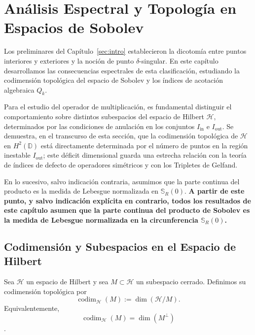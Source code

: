 \chapter{Análisis Espectral y Topología en Espacios de Sobolev}\label{sec:espectral}

Los preliminares del Capítulo~\ref{sec:intro} establecieron la dicotomía entre puntos interiores y exteriores y la noción de punto $\delta$-singular. En este capítulo desarrollamos las consecuencias espectrales de esta clasificación, estudiando la codimensión topológica del espacio de Sobolev y los índices de acotación algebraica $Q_k$.

Para el estudio del operador de multiplicación, es fundamental distinguir el comportamiento sobre distintos subespacios del espacio de Hilbert $\mathcal{H}$, determinados por las condiciones de anulación en los conjuntos $I_{\mathrm{in}}$ e $I_{\mathrm{out}}$. Se demuestra, en el transcurso de esta sección, que la codimensión topológica de $\mathcal{H}$ en $H^2(\mathbb{D})$ está directamente determinada por el número de puntos en la región inestable $I_{\mathrm{out}}$; este déficit dimensional guarda una estrecha relación con la teoría de índices de defecto de operadores simétricos y con los Tripletes de Gelfand.

\begin{rmk}
	En lo sucesivo, salvo indicación contraria, asumimos que la parte continua del producto es la medida de Lebesgue normalizada en $\mathbb{S}_R(0)$. \textbf{A partir de este punto, y salvo indicación explícita en contrario, todos los resultados de este capítulo asumen que la parte continua del producto de Sobolev es la medida de Lebesgue normalizada en la circunferencia $\mathbb{S}_R(0)$.}
\end{rmk}

\section{Codimensión y Subespacios en el Espacio de Hilbert}

\begin{defn}\label{def:codim_top_hilbert}
	Sea $\mathcal{H}$ un espacio de Hilbert y sea $M\subset \mathcal{H}$ un subespacio cerrado. Definimos su codimensión topológica por
	$$
		\operatorname{codim}_{\mathcal{H}}(M):=\dim(\mathcal{H}/M).
	$$
	Equivalentemente,
	$$
		\operatorname{codim}_{\mathcal{H}}(M)=\dim(M^\perp)
	$$
	\cite{halmos1982hilbert}.
\end{defn}

